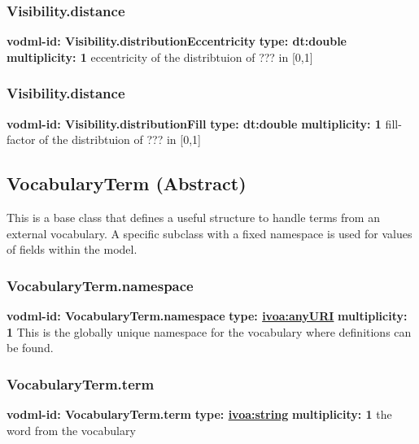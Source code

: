     \subsubsection{Visibility.distance}
      \textbf{vodml-id: Visibility.distributionEccentricity} \newline
      \textbf{type: dt:double} \newline
      \textbf{multiplicity: 1} \newline
      eccentricity of the distribtuion of ??? in [0,1]

    \subsubsection{Visibility.distance}
      \textbf{vodml-id: Visibility.distributionFill} \newline
      \textbf{type: dt:double} \newline
      \textbf{multiplicity: 1} \newline
      fill-factor of the distribtuion of ??? in [0,1]

  \subsection{VocabularyTerm (Abstract)}
  \label{sect:VocabularyTerm}
    This is a base class that defines a useful structure to handle terms from an external vocabulary. A specific subclass with a fixed namespace is used for values of fields within the model. 

    \subsubsection{VocabularyTerm.namespace}
      \textbf{vodml-id: VocabularyTerm.namespace} \newline
      \textbf{type: \hyperref[sect:ivoa]{ivoa:anyURI}} \newline
      \textbf{multiplicity: 1} \newline
      This is the globally unique namespace for the vocabulary where definitions can be found.

    \subsubsection{VocabularyTerm.term}
      \textbf{vodml-id: VocabularyTerm.term} \newline
      \textbf{type: \hyperref[sect:ivoa]{ivoa:string}} \newline
      \textbf{multiplicity: 1} \newline
      the word from the vocabulary

